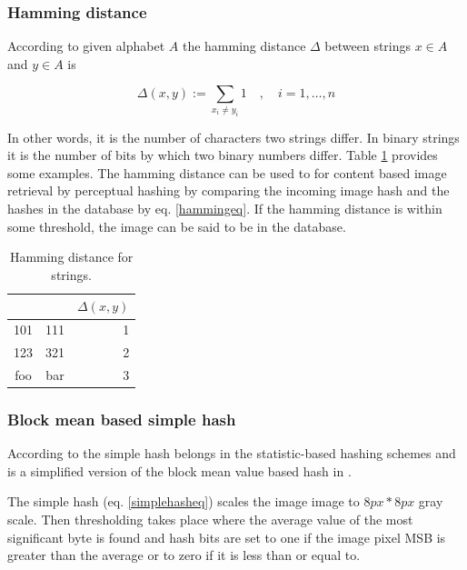 \documentclass[english,12pt,a4paper,pdftex,elec,utf8]{aaltothesis}
\begin{document}
\subsubsection{Hamming distance}\label{HammingSection}
According to \cite{Hamming1950} given alphabet $A$ the hamming distance $\Delta$ between strings $x \in A$ and $y \in A$ is

\begin{equation}\label{hammingeq}
\Delta(x,y):=\sum_{x_i\neq y_i}1\quad,\quad i=1,\ldots,n
\end{equation}

In other words, it is the number of characters two strings differ. In binary strings it is the number of bits by which two binary numbers differ. Table \ref{hammingexamples} provides some examples. The hamming distance can be used to for content based image retrieval by perceptual hashing by comparing the incoming image hash and the hashes in the database by eq. \ref{hammingeq}. If the hamming distance is within some threshold, the image can be said to be in the database.

\begin{table}[htb]
\caption{Hamming distance for strings.}
\label{hammingexamples}
\begin{center}
  \begin{tabular}{ccr}
&&$\Delta(x,y)$\\
    \hline \hline
    101 & 111 & 1\\
    \hline
    123 & 321 & 2\\
    \hline
    foo & bar & 3\\
    \hline
\end{tabular}
\end{center}\end{table}

\subsubsection{Block mean based simple hash}\label{simplehash}
According to \cite[p. 20]{Hadmi2012} the simple hash belongs in the statistic-based hashing schemes and is a simplified version of the block mean value based hash in \cite{Yang2006}.

The simple hash (eq. \ref{simplehasheq}) scales the image image to $8px * 8px$ gray scale. Then thresholding takes place where the average value of the most significant byte is found and hash bits are set to one if the image pixel MSB is greater than the average or to zero if it is less than or equal to.
\end{document}
